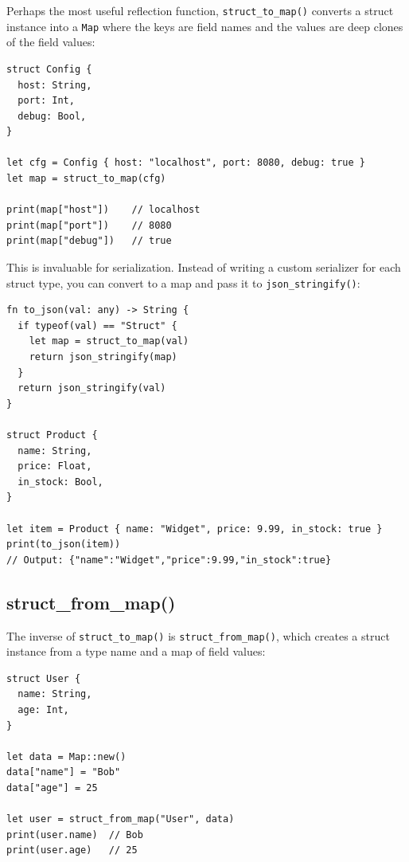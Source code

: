 Perhaps the most useful reflection function, \lstinline|struct_to_map()| converts a struct instance into a \lstinline|Map| where the keys are field names and the values are deep clones of the field values:

\begin{lstlisting}[language=Lattice, caption={Converting a struct to a map}]
struct Config {
  host: String,
  port: Int,
  debug: Bool,
}

let cfg = Config { host: "localhost", port: 8080, debug: true }
let map = struct_to_map(cfg)

print(map["host"])    // localhost
print(map["port"])    // 8080
print(map["debug"])   // true
\end{lstlisting}

This is invaluable for serialization.
Instead of writing a custom serializer for each struct type, you can convert to a map and pass it to \lstinline|json_stringify()|:

\begin{lstlisting}[language=Lattice, caption={Generic struct serialization via struct\_to\_map}]
fn to_json(val: any) -> String {
  if typeof(val) == "Struct" {
    let map = struct_to_map(val)
    return json_stringify(map)
  }
  return json_stringify(val)
}

struct Product {
  name: String,
  price: Float,
  in_stock: Bool,
}

let item = Product { name: "Widget", price: 9.99, in_stock: true }
print(to_json(item))
// Output: {"name":"Widget","price":9.99,"in_stock":true}
\end{lstlisting}

\subsection{struct\_from\_map()}


The inverse of \lstinline|struct_to_map()| is \lstinline|struct_from_map()|, which creates a struct instance from a type name and a map of field values:

\begin{lstlisting}[language=Lattice, caption={Creating a struct from a map}]
struct User {
  name: String,
  age: Int,
}

let data = Map::new()
data["name"] = "Bob"
data["age"] = 25

let user = struct_from_map("User", data)
print(user.name)  // Bob
print(user.age)   // 25
\end{lstlisting}

